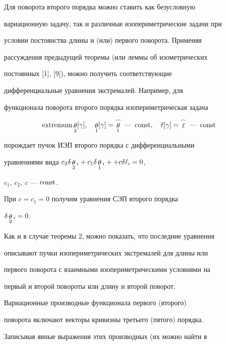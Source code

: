  


 


Для поворота второго порядка можно ставить как безусловную 


вариационную задачу, так и различные изопериметрические задачи при 


условии постоянства длины и (или) первого поворота. Применяя 


рассуждения предыдущей теоремы (или леммы об изометрических 


постоянных [1], [9]), можно получить соответствующие 


дифференциальные уравнения экстремалей. Например, для 


функционала поворота второго порядка изопериметрическая задача 


$$ 


\extr\mymath{\theta}_2[\gamma],\quad 


\mymath{\theta}_1[\gamma]=\mymath{\theta}_1^\frown 


\text{ --- }\const,\quad \ell[\gamma]= 


\mymath{\ell}^\frown\text{ --- }\const 


$$ 


порождает пучок ИЭП второго порядка с дифференциальными 


уравнениями вида $c_2\delta\mymath{\theta}_2{}_i+ 


c_1\delta\mymath{\theta}_1{}_i+ +c\delta\ell_i=0$,




$c_1,\ c_2,\ c$ --- $\operatorname{const}$. 


При $c=c_1=0$ получим уравнения СЭП второго порядка 


$\delta\mathop{\theta}\limits_2{}_i=0$. 


Как и в случае теоремы 2, можно показать, что последние уравнения 


описывают пучки изопериметрических экстремалей для длины или 


первого поворота с взаимными изопериметрическими условиями на 


первый и второй повороты или длину и второй поворот. 


 


Вариационные производные функционала первого (второго) 


поворота включают векторы кривизны третьего (пятого) порядка. 


Записывая явные выражения этих производных (их можно найти в 


